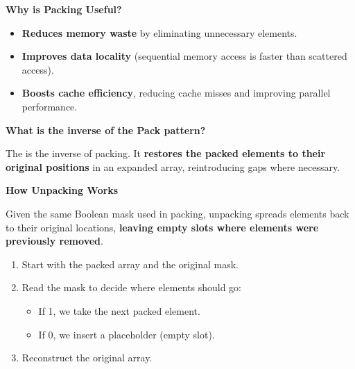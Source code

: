 \highspace
\begin{flushleft}
    \textcolor{Green3}{ \textbf{Why is Packing Useful?}}
\end{flushleft}
\begin{itemize}
    \item \textcolor{Green3}{\textbf{Reduces memory waste}} by eliminating unnecessary elements.
    \item \textcolor{Green3}{\textbf{Improves data locality}} (sequential memory access is faster than scattered access).
    \item \textcolor{Green3}{\textbf{Boosts cache efficiency}}, reducing cache misses and improving parallel performance.
\end{itemize}

\highspace
\begin{flushleft}
    \textcolor{Red2}{ \textcolor{Red2}{\textbf{What is the inverse of the Pack pattern?}}}
\end{flushleft}
The  is the inverse of packing. It \textbf{restores the packed elements to their original positions} in an expanded array, reintroducing gaps where necessary.

\highspace
\begin{flushleft}
    \textcolor{Green3}{ \textbf{How Unpacking Works}}
\end{flushleft}
Given the same Boolean mask used in packing, unpacking spreads elements back to their original locations, \textbf{leaving empty slots where elements were previously removed}.
\begin{enumerate}
    \item Start with the packed array and the original mask.
    \item Read the mask to decide where elements should go:
    \begin{itemize}
        \item If 1, we take the next packed element.
        \item If 0, we insert a placeholder (empty slot).
    \end{itemize}
    \item Reconstruct the original array.
\end{enumerate}


